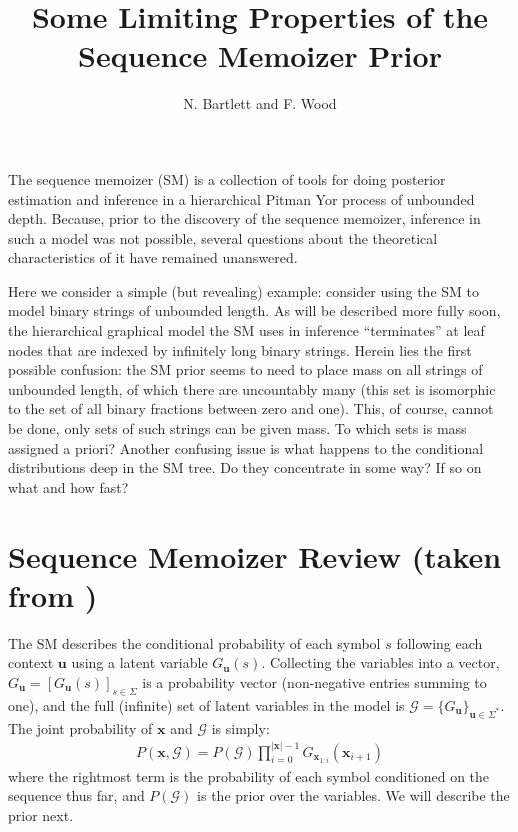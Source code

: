 \documentclass[11pt]{amsart}
\title{Some Limiting Properties of the Sequence Memoizer Prior}
\author{N. Bartlett and F. Wood}
\newcommand{\ubf}{\mathbf{u}}
\newcommand{\xbf}{\mathbf{x}}
\begin{document}
\maketitle
The sequence memoizer (SM) is a collection of tools for doing posterior estimation and inference in a hierarchical Pitman Yor process of unbounded depth.   Because, prior to the discovery of the sequence memoizer, inference in such a model was not possible, several questions about the theoretical characteristics of it have remained unanswered.  %

Here we consider a simple (but revealing) example: consider using the SM to model binary strings of unbounded length.  As will be described more fully soon, the hierarchical graphical model the SM uses in inference ``terminates'' at leaf nodes that are indexed by infinitely long binary strings.   Herein lies the first possible confusion: the SM prior seems to need to place mass on all strings of unbounded length, of which there are uncountably many (this set is isomorphic to the set of all binary fractions between zero and one).   This, of course, cannot be done, only sets of such strings can be given mass.  To which sets is mass assigned a priori?  Another confusing issue is what happens to the conditional distributions deep in the SM tree.  Do they concentrate in some way?  If so on what and how fast?  

\section{Sequence Memoizer Review (taken from \cite{gasthaus})}

\def\GG{\mathcal{G}} The SM describes the conditional probability of each
symbol $s$ following each context $\ubf$ using a latent variable $G_\ubf(s)$.
Collecting the variables into a vector, $G_\ubf=[G_\ubf(s)]_{s\in\Sigma}$ is a
probability vector (non-negative entries summing to one), and the full
(infinite) set of latent variables in the model is
$\GG=\{G_\ubf\}_{\ubf\in\Sigma^*}$.  The joint probability of $\xbf$ and $\GG$
is simply:
\begin{align}
P(\xbf,\GG) = P(\GG)\prod_{i=0}^{|\xbf|-1}G_{\xbf_{1:i}}(\xbf_{i+1})
\end{align}
where the rightmost term is the probability of each symbol conditioned on the sequence thus far, and $P(\GG)$ is the prior over the variables.  We will describe the prior next. 
\end{document}
